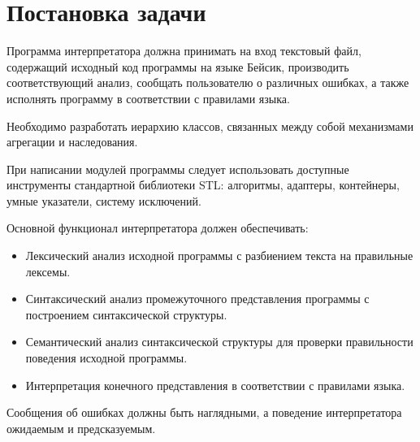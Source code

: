 \section{Постановка задачи}

Программа интерпретатора должна принимать на вход
текстовый файл, содержащий исходный код программы на 
языке Бейсик, производить соответствующий анализ,
сообщать пользователю о различных ошибках,
а также исполнять программу в соответствии с правилами
языка.

Необходимо разработать иерархию классов, связанных между
собой механизмами агрегации и наследования.

При написании модулей программы следует использовать
доступные инструменты стандартной библиотеки STL:
алгоритмы, адаптеры, контейнеры, умные указатели,
систему исключений.

Основной функционал интерпретатора должен обеспечивать:
\begin{itemize}
    \item Лексический анализ исходной программы
          с разбиением текста на правильные лексемы.

    \item Синтаксический анализ промежуточного представления
          программы с построением синтаксической структуры.
          
    \item Семантический анализ синтаксической структуры для
          проверки правильности поведения исходной программы.
          
    \item Интерпретация конечного представления в соответствии
          с правилами языка.
\end{itemize}

Сообщения об ошибках должны быть наглядными, а поведение
интерпретатора ожидаемым и предсказуемым.
